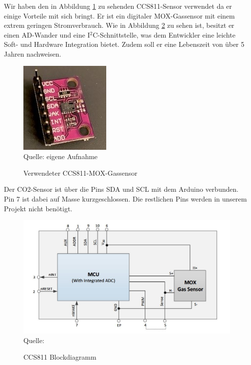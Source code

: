 \label{CCS811}

Wir haben den in Abbildung \ref{fig:CCS811-Bild}  zu sehenden CCS811-Sensor verwendet da er einige Vorteile mit sich bringt. Er ist ein digitaler \ac{MOX}-Gassensor mit einem extrem geringen Stromverbrauch. Wie in Abbildung \ref{fig:ccs811Blockdiagramm} zu sehen ist, besitzt er einen \ac{AD}-Wander und eine I$^2$C-Schnittstelle, was dem Entwickler eine leichte Soft- und Hardware Integration bietet. Zudem soll er eine Lebenszeit von über 5 Jahren nachweisen. \cite[vgl. S. 1]{amsAG.2016} \\

\begin{figure}[!hbt]
	\centering
	\includegraphics[width=0.3\linewidth]{Images/CO2SensorCCS811}
	\footnotesize \\Quelle: eigene Aufnahme
	\caption{Verwendeter CCS811-\ac{MOX}-Gassensor}
	\label{fig:CCS811-Bild}
\end{figure}

Der CO2-Sensor ist über die Pins SDA und SCL mit dem Arduino verbunden. Pin 7 ist dabei auf Masse kurzgeschlossen. Die restlichen Pins werden in unserem Projekt nicht benötigt.

\begin{figure}[!hbt]
	\centering
	\includegraphics[width=0.9\linewidth]{Images/ccs811Blockdiagramm}
	\footnotesize{\\ Quelle: \cite[S. 3]{amsAG.2016}}
	\caption{CCS811 Blockdiagramm}
	\label{fig:ccs811Blockdiagramm}
\end{figure}


